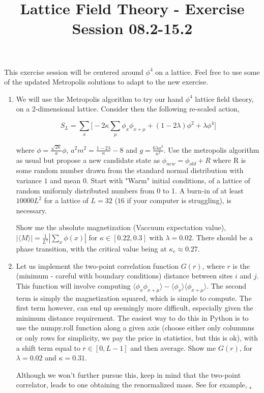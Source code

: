 \documentclass{article}
\title{Lattice Field Theory - Exercise Session 08.2-15.2}
\begin{document}
\maketitle

This exercise session will be centered around $\phi^4$ on a lattice. Feel free to use some of the updated Metropolis solutions to adapt to the new exercise.

\begin{enumerate}

\item  We will use the Metropolis algorithm to try our hand $\phi^4$ lattice field theory, on a 2-dimensional lattice. Consider then the following re-scaled action,

\begin{equation}
	S_L =  \sum_x \bigg[ - 2\kappa \sum_\mu \phi_x \phi_{x+\mu} + (1-2\lambda) \phi^2 + \lambda \phi^4 \bigg]
\end{equation}

where $\phi = \frac{\sqrt{2\kappa}}{a} \phi$, $a^2 m^2 = \frac{1-2\lambda}{\kappa} - 8 $ and $g=\frac{6\lambda a^2}{\kappa^2}$. Use the metropolis algorithm as usual but propose a new candidate state as $\phi_{new} = \phi_{old} + R$ where R is some random number drawn from the standard normal distribution with variance $1$ and mean $0$. Start with "Warm" initial conditions, of a lattice of random uniformly distributed numbers from 0 to 1. A burn-in of at least $10000 L^2$ for a lattice of $L=32$ ($16$ if your computer is struggling), is necessary.

Show me the absolute magnetization (Vaccuum expectation value), $|\langle M \rangle| = \frac{1}{L^2}| \sum_x \phi(x) |$ for $\kappa \in [0.22,0.3]$ with $\lambda = 0.02$. There should be a phase transition, with the critical value being at $\kappa_c \approx 0.27$.

\item Let us implement the two-point correlation function $G(r)$, where $r$ is the (minimum - careful with boundary conditions) distance between sites $i$ and $j$. This function will involve computing $\langle \phi_x \phi_{x+\mu} \rangle - \langle \phi_x \rangle \langle \phi_{x+\mu} \rangle$. The second term is simply the magnetization squared, which is simple to compute. The first term however, can end up seemingly more difficult, especially given the minimum distance requirement.  The easiest way to do this in Python is to use the numpy.roll function along a given axis (choose either only colummns or only rows for simplicity, we pay the price in statistics, but this is ok), with a shift term equal to $r \in [0,L-1]$ and then average. Show me $G(r)$, for $\lambda=0.02$ and $\kappa=0.31$. 

Although we won't further pursue this, keep in mind that the two-point correlator, leads to one obtaining the renormalized mass. See for example, \href{https://arxiv.org/abs/1705.06231}.
\end{enumerate}
\end{document}
